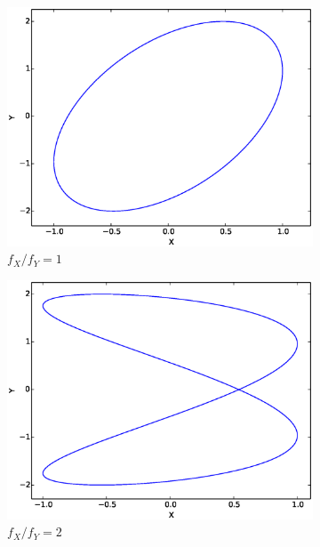 \documentclass{article}
\theoremstyle{definition}
\renewcommand{\>}{\rangle}
\newcommand{\<}{\langle}
\begin{document}
\begin{figure}\centering
\begin{subfigure}{0.48\textwidth}\centering
\includegraphics[width=\textwidth]{figure_1.eps}
\caption{$f_X/f_Y = 1$}
\end{subfigure}
\begin{subfigure}{0.48\textwidth}\centering
\includegraphics[width=\textwidth]{figure_2.eps}
\caption{$f_X/f_Y = 2$}\label{fig:flip}
\end{subfigure}
\begin{subfigure}{0.48\textwidth}\centering

\end{subfigure}
\end{figure}
\end{document}
